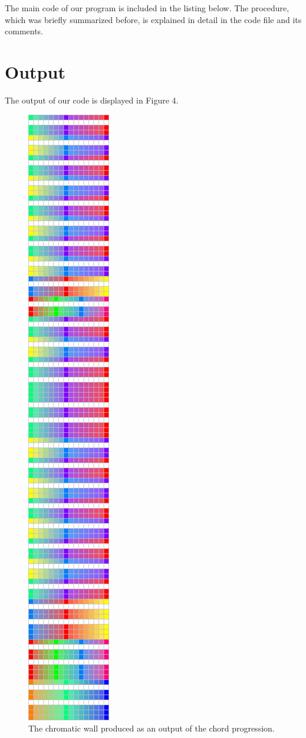 \documentclass{article}
\begin{document}
The main code of our program is included in the listing below. The procedure, which was briefly summarized before, is explained in detail in the code file and its comments.


\section{Output}

The output of our code is displayed in Figure 4.\\

\begin{figure}
    \includegraphics[width=0.2\linewidth]{output.png}
    \centering
    \caption{The chromatic wall produced as an output of the chord progression.}
    \label{fig:output}
\end{figure}
\end{document}
